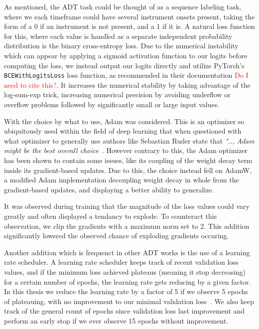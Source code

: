 As mentioned, the \gls{ADT} task could be thought of as a sequence labeling task, where we each timeframe could have several instrument onsets present, taking the form of a 0 if an instrument is not present, and a 1 if it is. A natural loss function for this, where each value is handled as a separate independent probability distribution is the binary cross-entropy loss. Due to the numerical instability which can appear by applying a sigmoid activation function to our logits before computing the loss, we instead output our logits directly and utilize PyTorch's \texttt{BCEWithLogitsLoss} loss function, as recommended in their documentation \textcolor{red}{Do I need to cite this?}. It increases the numerical stability by taking advantage of the log-sum-exp trick, increasing numerical precision by avoiding underflow or overflow problems followed by significantly small or large input values.

With the choice by what to use, Adam was considered. This is an optimizer so ubiquitously used within the field of deep learning that when questioned with what optimizer to generally use authors like Sebastian Ruder state that \textit{".., Adam might be the best overall choice}~\cite{ruder2017overviewgradientdescentoptimization}. However contrary to this, the Adam optimizer has been shown to contain some issues, like its coupling of the weight decay term inside its gradient-based updates. Due to this, the choice instead fell on AdamW, a modified Adam implementation decoupling weight decay in whole from the gradient-based updates, and displaying a better ability to generalize.~\cite{kingma2017adammethodstochasticoptimization, bock2018improvementconvergenceproofadamoptimizer, loshchilov2019decoupledweightdecayregularization}

It was observed during training that the magnitude of the loss values could vary greatly and often displayed a tendancy to explode. To counteract this observation, we clip the gradients with a maximum norm set to 2. This addition significantly lowered the observed chance of exploding gradients occuring. 

Another addition which is frequenct in other \gls{ADT} works is the use of a learning rate scheduler. A learning rate scheduler keeps track of recent validation loss values, and if the minimum loss achieved plateaus (meaning it stop decreasing) for a certain number of epochs, the learning rate gets reducing by a given factor. In this thesis we reduce the learning rate by a factor of 5 if we observe 5 epochs of plateauing, with no improvement to our minimal validation loss~\cite{chang2024yourmt3multiinstrumentmusictranscription, signals4040042}. We also keep track of the general count of epochs since validation loss last improvement and perform an early stop if we ever observe 15 epochs without improvement.

